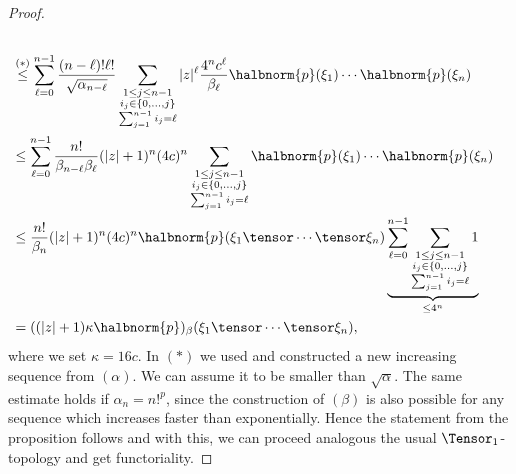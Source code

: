 \documentclass[
11pt,                          %
english                        %
]{article}
\begin{document}
\begin{proof}
\begin{align*}
		\\
		& \stackrel{(*)}{\leq}
		\sum\limits_{\ell = 0}^{n-1}
		\frac{(n-\ell)! \ell!}{\sqrt{\alpha_{n - \ell}}}
		\sum\limits_{\substack{
			1 \leq j \leq n-1 \\
			i_j \in \{0, \ldots, j\} \\
			\sum_{j=1}^{n-1} i_j = \ell
		}}
		|z|^\ell
		\frac{4^n c^\ell}{\beta_{\ell}}
		\halbnorm{p}(\xi_1) \cdots \halbnorm{p}(\xi_n)
		\\
		& \leq
		\sum\limits_{\ell = 0}^{n-1}
		\frac{n!}{\beta_{n - \ell} \beta_\ell}
		(|z| + 1)^n
		(4c)^n
		\sum\limits_{\substack{
			1 \leq j \leq n-1 \\
			i_j \in \{0, \ldots, j\} \\
			\sum_{j=1}^{n-1} i_j = \ell
		}}
		\halbnorm{p}(\xi_1) \cdots \halbnorm{p}(\xi_n)
		\\
		& \leq
		\frac{n!}{\beta_n}
		(|z| + 1)^n (4c)^n
		\halbnorm{p}(\xi_1 \tensor \cdots \tensor \xi_n)
		\underbrace{
			\sum\limits_{\ell = 0}^{n-1}
			\sum\limits_{\substack{
				1 \leq j \leq n-1 \\
				i_j \in \{0, \ldots, j\} \\
				\sum_{j=1}^{n-1} i_j = \ell
			}}
			1
		}_{ \leq 4^n }
		\\
		&=
		( (|z| + 1) \kappa \halbnorm{p})_\beta
		(\xi_1 \tensor \cdots \tensor \xi_n),
	\end{align*}
	where we set $\kappa = 16 c$. In $(*)$ we used \cite[Lemma 6.4.7]{stapor:2015a}
	and constructed a new increasing sequence from $(\alpha)$. We can assume it
	to be smaller than $\sqrt{\alpha}$. The same estimate holds if $\alpha_n = n!^p$,
	since the construction of $(\beta)$ is also possible for any sequence which 
	increases faster than exponentially. Hence the statement from the proposition 
	follows and with this, we can proceed analogous the usual $\Tensor_1$-topology 
	and get functoriality.
\end{proof}
\end{document}
